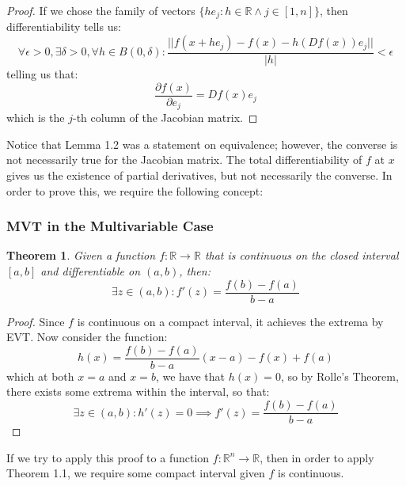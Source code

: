 \documentclass[10pt,letterpaper]{article} %
\newtheorem{thm}{Theorem}[section]
\begin{document}
\begin{proof}
If we chose the family of vectors $\{he_j : h \in \mathbb{R} \land j \in [1, n]\}$, then differentiability tells us:
\begin{equation*}
\forall \epsilon > 0, \exists \delta > 0, \forall h \in B(0, \delta): \frac{||f(x+he_j) - f(x) - h(Df(x))e_j||}{|h|} < \epsilon
\end{equation*}
telling us that:
\begin{equation*}
\frac{\partial f(x)}{\partial e_j} = Df(x)e_j
\end{equation*}
which is the $j$-th column of the Jacobian matrix.
\end{proof}
Notice that Lemma 1.2 was a statement on equivalence; however, the converse is not necessarily true for the Jacobian matrix. The total differentiability of $f$ at $x$ gives us the existence of partial derivatives, but not necessarily the converse. In order to prove this, we require the following concept:

\subsubsection{MVT in the Multivariable Case}
\begin{thm}
Given a function $f: \mathbb{R} \xrightarrow{} \mathbb{R}$ that is continuous on the closed interval $[a, b]$ and differentiable on $(a, b)$, then:
\begin{equation*}
\exists z \in (a, b): f'(z) = \frac{f(b) - f(a)}{b-a}
\end{equation*}
\end{thm}
\begin{proof}
Since $f$ is continuous on a compact interval, it achieves the extrema by EVT. Now consider the function:
\begin{equation*}
h(x) = \frac{f(b) - f(a)}{b-a}(x-a) - f(x) + f(a)
\end{equation*}
which at both $x = a$ and $x = b$, we have that $h(x) = 0$, so by Rolle's Theorem, there exists some extrema within the interval, so that:
\begin{equation*}
\exists z \in (a, b): h'(z) = 0 \implies f'(z) = \frac{f(b) - f(a)}{b-a}
\end{equation*}
\end{proof}
If we try to apply this proof to a function $f: \mathbb{R}^n \xrightarrow{} \mathbb{R}$, then in order to apply Theorem 1.1, we require some compact interval given $f$ is continuous.\\
\end{document}
